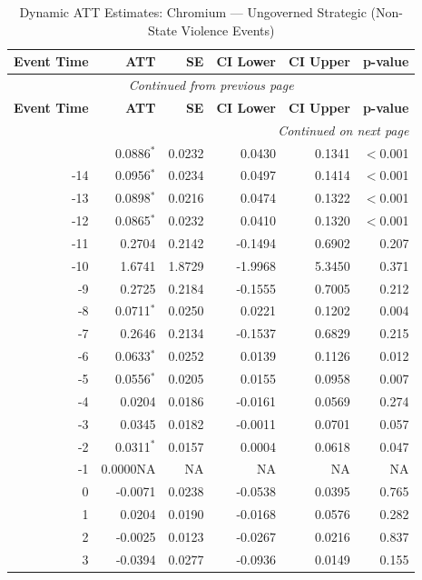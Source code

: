 \begin{longtable}{rrrrrr}
\caption{Dynamic ATT Estimates: Chromium --- Ungoverned Strategic (Non-State Violence Events)} \label{tab:chromium_non_state_violence_events} \\
\toprule
\textbf{Event Time} & \textbf{ATT} & \textbf{SE} & \textbf{CI Lower} & \textbf{CI Upper} & \textbf{p-value} \\
\midrule
\endfirsthead
\multicolumn{6}{c}{\textit{Continued from previous page}} \\
\toprule
\textbf{Event Time} & \textbf{ATT} & \textbf{SE} & \textbf{CI Lower} & \textbf{CI Upper} & \textbf{p-value} \\
\midrule
\endhead
\midrule \multicolumn{6}{r}{\textit{Continued on next page}} \\
\endfoot
\bottomrule
\endlastfoot
-15 & 0.0886$^{*}$ & 0.0232 & 0.0430 & 0.1341 & $<$0.001 \\
-14 & 0.0956$^{*}$ & 0.0234 & 0.0497 & 0.1414 & $<$0.001 \\
-13 & 0.0898$^{*}$ & 0.0216 & 0.0474 & 0.1322 & $<$0.001 \\
-12 & 0.0865$^{*}$ & 0.0232 & 0.0410 & 0.1320 & $<$0.001 \\
-11 & 0.2704 & 0.2142 & -0.1494 & 0.6902 & 0.207 \\
-10 & 1.6741 & 1.8729 & -1.9968 & 5.3450 & 0.371 \\
-9 & 0.2725 & 0.2184 & -0.1555 & 0.7005 & 0.212 \\
-8 & 0.0711$^{*}$ & 0.0250 & 0.0221 & 0.1202 & 0.004 \\
-7 & 0.2646 & 0.2134 & -0.1537 & 0.6829 & 0.215 \\
-6 & 0.0633$^{*}$ & 0.0252 & 0.0139 & 0.1126 & 0.012 \\
-5 & 0.0556$^{*}$ & 0.0205 & 0.0155 & 0.0958 & 0.007 \\
-4 & 0.0204 & 0.0186 & -0.0161 & 0.0569 & 0.274 \\
-3 & 0.0345 & 0.0182 & -0.0011 & 0.0701 & 0.057 \\
-2 & 0.0311$^{*}$ & 0.0157 & 0.0004 & 0.0618 & 0.047 \\
-1 & 0.0000NA & NA & NA & NA & NA \\
0 & -0.0071 & 0.0238 & -0.0538 & 0.0395 & 0.765 \\
1 & 0.0204 & 0.0190 & -0.0168 & 0.0576 & 0.282 \\
2 & -0.0025 & 0.0123 & -0.0267 & 0.0216 & 0.837 \\
3 & -0.0394 & 0.0277 & -0.0936 & 0.0149 & 0.155 \\

\end{longtable}
